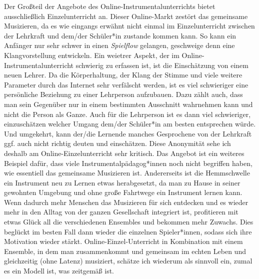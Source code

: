 Der Großteil der Angebote des Online-Instrumentalunterrichts bietet
ausschließlich Einzelunterricht an. Dieser Online-Markt zestört das gemeinsame
Musizieren, da es wie eingangs erwähnt nicht einmal im Einzelunterricht zwischen
der Lehrkraft und dem/der Schüler*in zustande kommen kann. So kann ein Anfänger
nur sehr schwer in einen \emph{Spielflow} gelangen, geschweige denn eine
Klangvorstellung entwickeln. Ein weietrer Aspekt, der im
Online-Instrumentalunterricht schwierig zu erfassen ist, ist die Einschätzung
von einem neuen Lehrer. Da die Körperhaltung, der Klang der Stimme und viele
weitere Parameter durch das Internet sehr verfälscht werden, ist es viel
schwieriger eine persönliche Beziehung zu einer Lehrperson aufzubauen. Dazu
zählt auch, dass man sein Gegenüber nur in einem bestimmten Ausschnitt
wahrnehmen kann und nicht die Person als Ganze. Auch für die Lehrperson ist es
dann viel schwieriger, einzuschätzen welcher Umgang dem/der Schüler*in am besten
entsprechen würde. Und umgekehrt, kann der/die Lernende manches Gesprochene von
der Lehrkraft ggf. auch nicht richtig deuten und einschätzen.
Diese Anonymität sehe ich
deshalb am Online-Einzelunterricht sehr kritisch.
Das Angebot ist ein weiteres
Beispiel dafür, dass viele Instrumentalpädagog*innen noch nicht begriffen haben,
wie essentiell das gemeinsame Musizieren ist. Andererseits ist die Hemmschwelle
ein Instrument neu zu Lernen etwas herabgesetzt, da man zu Hause in seiner
gewohnten Umgebung und ohne große Fahrtwege ein Instrument lernen kann. Wenn
dadurch mehr Menschen das Musizieren für sich entdecken und es wieder mehr in
den Alltag von der ganzen Gesellschaft integriert ist, profitieren mit etwas Glück
all die verschiedenen Ensembles und bekommen mehr Zuwachs. Dies beglückt im
besten Fall dann wieder die einzelnen Spieler*innen, sodass sich ihre Motivation
wieder stärkt. Online-Einzel-Unterricht in Kombination mit einem Ensemble, in
dem man zusammenkommt und gemeinsam im echten Leben und gleichzeitig (ohne
Latenz) musiziert, schätze ich wiederum als sinnvoll ein, zumal es ein Modell
ist, was zeitgemäß ist. 

